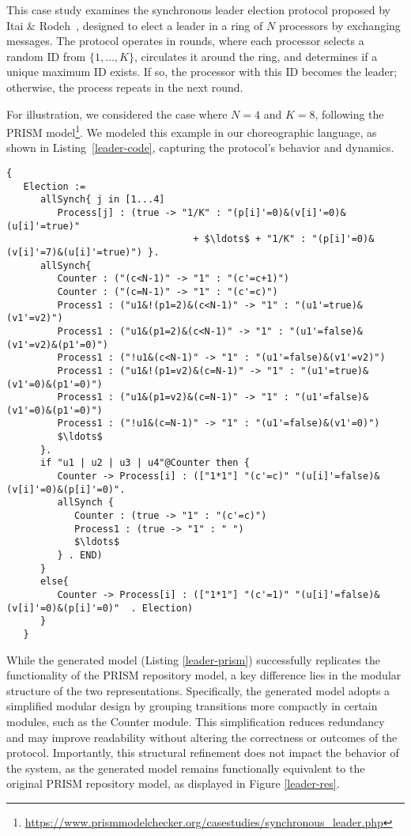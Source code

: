 This case study examines the synchronous leader election protocol proposed by Itai $\&$ Rodeh~\cite{IR90}, designed to elect a leader in a ring of $N$ processors by exchanging messages. The protocol operates in rounds, where each processor selects a random ID from $\{1, \ldots, K\}$, circulates it around the ring, and determines if a unique maximum ID exists. If so, the processor with this ID becomes the leader; otherwise, the process repeats in the next round.

For illustration, we considered the case where $ N=4 $ and $ K=8 $, following the PRISM model\footnote{\url{https://www.prismmodelchecker.org/casestudies/synchronous_leader.php}}. We modeled this example in our choreographic language, as shown in Listing~\ref{leader-code}, capturing the protocol's behavior and dynamics.

\begin{lstlisting}[style=chor-color,caption={Choreography for the Synchronous Leader Election Protocol.},captionpos=b,label={leader-code}]
   {
   Election := 
      allSynch{ j in [1...4]
         Process[j] : (true -> "1/K" : "(p[i]'=0)&(v[i]'=0)&(u[i]'=true)" 
                                 + $\ldots$ + "1/K" : "(p[i]'=0)&(v[i]'=7)&(u[i]'=true)") }.
      allSynch{
         Counter : ("(c<N-1)" -> "1" : "(c'=c+1)")
         Counter : ("(c=N-1)" -> "1" : "(c'=c)")
         Process1 : ("u1&!(p1=2)&(c<N-1)" -> "1" : "(u1'=true)&(v1'=v2)")
         Process1 : ("u1&(p1=2)&(c<N-1)" -> "1" : "(u1'=false)&(v1'=v2)&(p1'=0)")
         Process1 : ("!u1&(c<N-1)" -> "1" : "(u1'=false)&(v1'=v2)")
         Process1 : ("u1&!(p1=v2)&(c=N-1)" -> "1" : "(u1'=true)&(v1'=0)&(p1'=0)")
         Process1 : ("u1&(p1=v2)&(c=N-1)" -> "1" : "(u1'=false)&(v1'=0)&(p1'=0)")
         Process1 : ("!u1&(c=N-1)" -> "1" : "(u1'=false)&(v1'=0)")
         $\ldots$
      }.
      if "u1 | u2 | u3 | u4"@Counter then {
         Counter -> Process[i] : (["1*1"] "(c'=c)" "(u[i]'=false)&(v[i]'=0)&(p[i]'=0)". 
         allSynch {
            Counter : (true -> "1" : "(c'=c)")
            Process1 : (true -> "1" : " ")
            $\ldots$               
         } . END)
      }
      else{
         Counter -> Process[i] : (["1*1"] "(c'=1)" "(u[i]'=false)&(v[i]'=0)&(p[i]'=0)"  . Election)
      }      
   }
   \end{lstlisting} 
   While the generated model (Listing \ref{leader-prism}) successfully replicates the functionality of 
   the PRISM repository model, a key difference lies in the modular 
   structure of the two representations. 
   Specifically, the generated model adopts a simplified modular design by 
   grouping transitions more compactly in certain modules, such as the Counter module. 
   This simplification reduces redundancy and may improve readability without altering the correctness or outcomes of the protocol. Importantly, this structural refinement does not impact the behavior of the system, as the generated model remains functionally equivalent to the original PRISM repository model, as displayed in Figure \ref{leader-res}.

